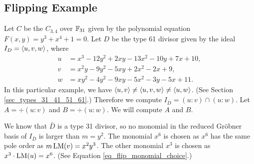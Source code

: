 
\subsection{Flipping Example}
\label{sec_flipping_example}

Let $C$ be the $C_{3,4}$ over $\mathbb{F}_{31}$ given by the polynomial equation $F(x,y) = y^3 + x^4 + 1 = 0$.
Let $D$ be the type 61 divisor given by the ideal $I_D = \left\langle u,v,w \right\rangle$, where
\begin{align*}
  u &=  x^3 - 12y^2 + 2xy - 13x^2 - 10y + 7x + 10, \\
  v &= x^2y -  9y^2 - 5xy +  2x^2 -  2x      +  9, \\
  w &= xy^2 -  4y^2 - 9xy -  5x^2 -  3y - 5x + 11.
\end{align*}
In this particular example, we have $\left\langle u,v \right\rangle \neq \left\langle u,v,w \right\rangle \neq \left\langle u,w \right\rangle$.
(See Section \ref{sec_types_31_41_51_61}.)
Therefore we compute $I_{\bar D} = (u : v) \cap (u : w)$.
Let $A = \div(u : v)$ and $B = \div(u : w)$.
We will compute $A$ and $B$.

We know that $\bar D$ is a type 31 divisor,
so no monomial in the reduced Gr\"obner basis of $I_{\bar D}$ is larger than $m = y^2$.
The monomial $x^6$ is chosen as $x^6$ has the same pole order as $m\operatorname{LM}(v) = x^2y^3$.
The other monomial $x^3$ is chosen as $x^3\cdot\operatorname{LM}(u) = x^6$.
(See Equation \ref{eq_flip_monomial_choice}.)

